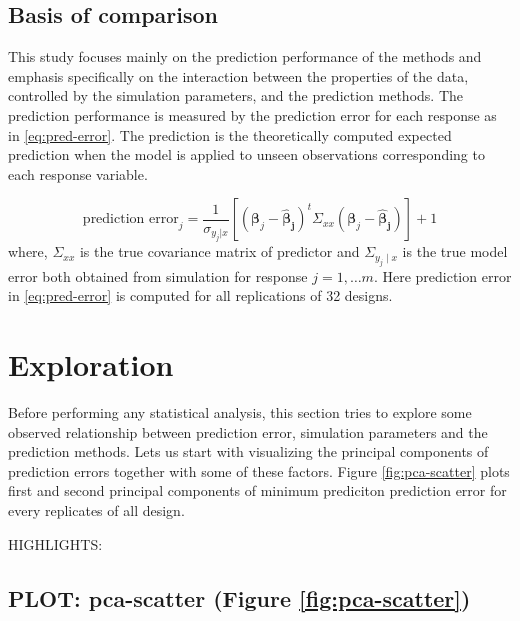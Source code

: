 \documentclass[12pt,3p,authoryear]{elsarticle}
\begin{document}
\hypertarget{basis-of-comparison}{%
\subsection{Basis of comparison}\label{basis-of-comparison}}

This study focuses mainly on the prediction performance of the methods
and emphasis specifically on the interaction between the properties of
the data, controlled by the simulation parameters, and the prediction
methods. The prediction performance is measured by the prediction error
for each response as in \eqref{eq:pred-error}. The prediction is the
theoretically computed expected prediction when the model is applied to
unseen observations corresponding to each response variable.

\begin{equation}
\text{prediction error}_j = \frac{1}{\sigma_{y_j|x}}\left[\left(\boldsymbol{\beta}_j - \boldsymbol{\hat{\beta}_j}\right)^t\Sigma_{xx}\left(\boldsymbol{\beta}_j - \boldsymbol{\hat{\beta}_j}\right)\right] + 1
\label{eq:pred-error}
\end{equation} where, \(\Sigma_{xx}\) is the true covariance matrix of
predictor and \(\Sigma_{y_j\mid x}\) is the true model error both
obtained from simulation for response \(j = 1, \ldots m\). Here
prediction error in \eqref{eq:pred-error} is computed for all replications
of 32 designs.

\hypertarget{exploration}{%
\section{Exploration}\label{exploration}}

Before performing any statistical analysis, this section tries to
explore some observed relationship between prediction error, simulation
parameters and the prediction methods. Lets us start with visualizing
the principal components of prediction errors together with some of
these factors. Figure \ref{fig:pca-scatter} plots first and second
principal components of minimum prediciton prediction error for every
replicates of all design.

HIGHLIGHTS:

\hypertarget{plot-pca-scatter-figure-reffigpca-scatter}{%
\subsection{PLOT: pca-scatter (Figure
\ref{fig:pca-scatter})}\label{plot-pca-scatter-figure-reffigpca-scatter}}
\end{document}

